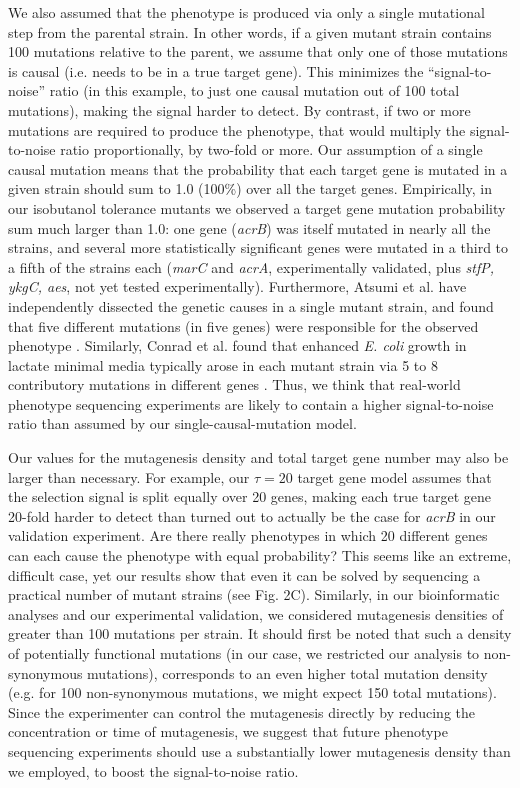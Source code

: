 \documentclass[letterpaper,10pt,english]{howto}
\begin{document}
We also assumed that the phenotype is produced via only a single mutational
step from the parental strain.  In other words, if a given mutant strain
contains 100 mutations relative to the parent, we assume that only
one of those mutations is causal (i.e. needs to be in a true target gene).
This minimizes the ``signal-to-noise'' ratio (in this example, to just one causal
mutation out of 100 total mutations), making the signal harder
to detect.  By contrast, if two or more mutations are required to produce
the phenotype, that would multiply the signal-to-noise ratio
proportionally, by two-fold or more.  Our assumption
of a single causal mutation means that the probability that each
target gene is mutated in a given strain should sum to 1.0 (100\%) over
all the target genes.  Empirically, in our isobutanol tolerance mutants
we observed a target gene mutation probability sum much larger than 1.0:
one gene (\emph{acrB}) was itself
mutated in nearly all the strains, and several more statistically
significant genes were mutated in a third to a fifth of the strains
each (\emph{marC} and \emph{acrA}, experimentally validated, plus \emph{stfP, ykgC, aes},
not yet tested experimentally).  Furthermore, Atsumi et al. have
independently dissected the genetic causes in a single mutant strain,
and found that five different mutations (in five genes) were
responsible for the observed phenotype \cite{Atsumi2011} .
Similarly, Conrad et al. found that enhanced \emph{E. coli} growth in
lactate minimal media typically arose in each mutant strain
via 5 to 8 contributory mutations in different genes
\cite{Conrad2009} .  Thus, we think that
real-world phenotype sequencing experiments are likely to
contain a higher signal-to-noise ratio than assumed by our
single-causal-mutation model.

Our values for the mutagenesis density and total
target gene number may also be larger than necessary.  For example,
our $\tau=20$ target gene model assumes that the
selection signal is split equally over 20 genes, making each
true target gene 20-fold harder to detect than turned out to actually
be the case for \emph{acrB} in our validation experiment.  Are there
really phenotypes in which 20 different genes can each cause the
phenotype with equal probability?  This seems like an extreme,
difficult case, yet our results show that even it
can be solved by sequencing a practical number of mutant strains
(see Fig. 2C).  Similarly, in our bioinformatic analyses and
our experimental validation, we considered mutagenesis densities
of greater than 100 mutations per strain.  It should first
be noted that such a density of potentially functional
mutations (in our case, we restricted our analysis to non-synonymous
mutations), corresponds to an even higher
total mutation density (e.g. for 100 non-synonymous mutations,
we might expect 150 total mutations).  Since the experimenter
can control the mutagenesis directly by reducing the concentration
or time of mutagenesis, we suggest that future phenotype sequencing
experiments should use a substantially lower mutagenesis density
than we employed, to boost the signal-to-noise ratio.
\end{document}
